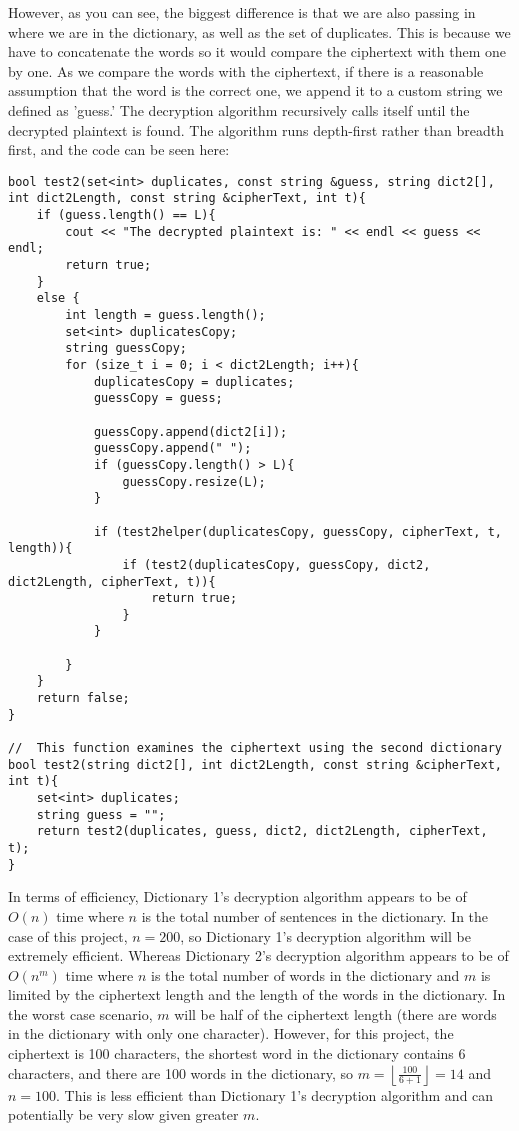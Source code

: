 \documentclass[a4paper,twoside,10pt]{report}
\providecommand{\myfloor}[1]{\left \lfloor #1 \right \rfloor }
\begin{document}
However, as you can see, the biggest difference is that we are also passing in where we are in the dictionary, as well as the set of duplicates. This is because we have to concatenate the words so it would compare the ciphertext with them one by one. As we compare the words with the ciphertext, if there is a reasonable assumption that the word is the correct one, we append it to a custom string we defined as 'guess.' The decryption algorithm recursively calls itself until the decrypted plaintext is found. The algorithm runs depth-first rather than breadth first, and the code can be seen here:

\begin{lstlisting}
bool test2(set<int> duplicates, const string &guess, string dict2[], int dict2Length, const string &cipherText, int t){
	if (guess.length() == L){
		cout << "The decrypted plaintext is: " << endl << guess << endl;
		return true;
	}
	else {
		int length = guess.length();
		set<int> duplicatesCopy;
		string guessCopy;
		for (size_t i = 0; i < dict2Length; i++){
			duplicatesCopy = duplicates;
			guessCopy = guess;

			guessCopy.append(dict2[i]);
			guessCopy.append(" ");
			if (guessCopy.length() > L){
				guessCopy.resize(L);
			}

			if (test2helper(duplicatesCopy, guessCopy, cipherText, t, length)){
				if (test2(duplicatesCopy, guessCopy, dict2, dict2Length, cipherText, t)){
					return true;
				}
			}

		}
	}
	return false;
}

//	This function examines the ciphertext using the second dictionary
bool test2(string dict2[], int dict2Length, const string &cipherText, int t){
	set<int> duplicates;
	string guess = "";
	return test2(duplicates, guess, dict2, dict2Length, cipherText, t);
}
\end{lstlisting}

\vspace{4mm}
In terms of efficiency, Dictionary 1's decryption algorithm appears to be of $O(n)$ time where $n$ is the total number of sentences in the dictionary. In the case of this project, $n=200$, so Dictionary 1's decryption algorithm will be extremely efficient. Whereas Dictionary 2's decryption algorithm appears to be of $O(n^m)$ time where $n$ is the total number of words in the dictionary and $m$ is limited by the ciphertext length and the length of the words in the dictionary. In the worst case scenario, $m$ will be half of the ciphertext length (there are words in the dictionary with only one character). However, for this project, the ciphertext is 100 characters, the shortest word in the dictionary contains 6 characters, and there are 100 words in the dictionary, so $m=\myfloor{\frac{100}{6+1}}=14$ and $n=100$. This is less efficient than Dictionary 1's decryption algorithm and can potentially be very slow given greater $m$. 
\end{document}
